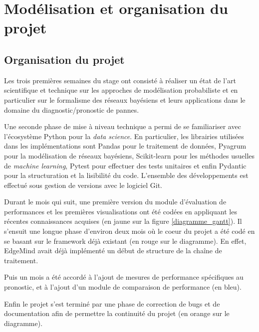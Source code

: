 \chapter{Modélisation et organisation du projet}
\clearpage
\section{Organisation du projet}

Les trois premières semaines du stage ont consisté à réaliser un état de l’art scientifique et technique sur les approches de modélisation probabiliste et en particulier sur le formalisme des réseaux bayésiens et leurs applications  dans le domaine du diagnostic/pronostic de pannes.

Une seconde phase de mise à niveau technique a permi de se familiariser avec  l’écosystème Python pour la \textit{data science}. En particulier, les librairies utilisées dans les implémentations sont Pandas pour le traitement de données, Pyagrum pour la modélisation de réseaux bayésiens, Scikit-learn pour les  méthodes usuelles de \textit{machine learning}, Pytest pour effectuer des tests unitaires et enfin Pydantic pour la structuration et la lisibilité du code. L’ensemble des développements est effectué sous gestion de versions avec le logiciel Git.

Durant le mois qui suit, une première version du module d’évaluation de performances et les premières visualisations ont été codées en appliquant les récentes connaissances acquises (en jaune sur la figure \ref{diagramme_gantt}).
Il s’ensuit une longue phase d’environ deux mois où le coeur du projet a été codé en se basant sur le framework déjà existant (en rouge sur le diagramme). En effet, EdgeMind avait déjà implémenté un début de structure de la chaîne de traitement.

Puis un mois a été accordé à l’ajout de mesures de performance spécifiques au pronostic, et à l’ajout d’un module de comparaison de performance (en bleu).

Enfin le projet s’est terminé par une phase de correction de bugs et de documentation afin de permettre la continuité du projet (en orange sur le diagramme).

